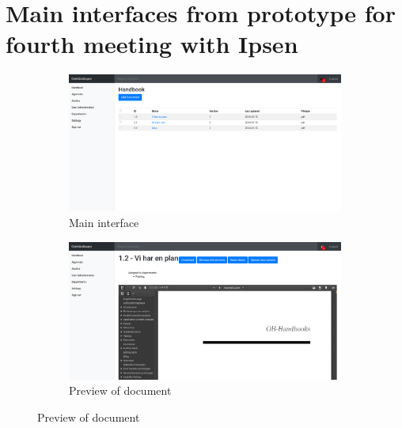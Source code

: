\section{Main interfaces from prototype for fourth meeting with Ipsen}\label{sec:2prototype}
\begin{figure}[H]
	\centering
	\begin{subfigure}[b]{0.48\textwidth}
		\includegraphics[width=\textwidth]{billeder/iteration2Prototyper/main.png}
		\caption{Main interface}
		\label{fig:4-MainAdmin}
	\end{subfigure}
	\quad
	\begin{subfigure}[b]{0.48\textwidth}
		\includegraphics[width=\textwidth]{billeder/iteration2Prototyper/Preview.png}
		\caption{Preview of document}
		\label{fig:4-DocPreview}
	\end{subfigure}
\end{figure}
